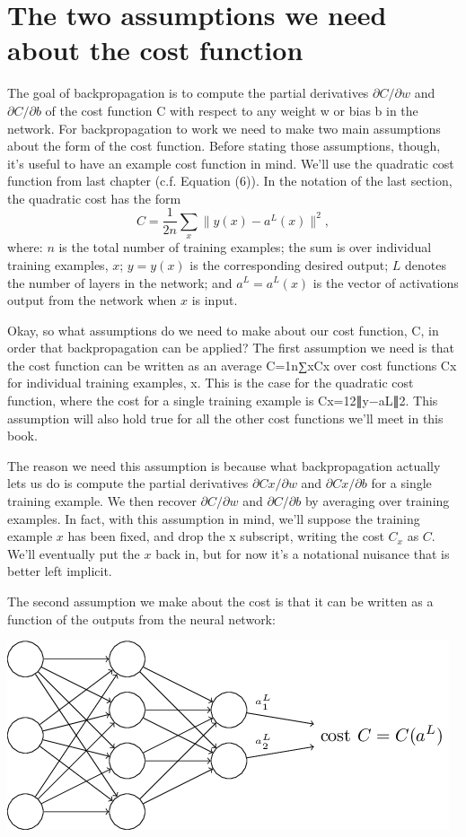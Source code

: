 \documentclass[a4paper,twoside,10pt]{book}
\begin{document}
\section{The two assumptions we need about the cost function}
The goal of backpropagation is to compute the partial derivatives $\partial{}C/\partial{}w$ and $\partial{}C/\partial{}b$ of the cost function C with respect to any weight w or bias b in the network. For backpropagation to work we need to make two main assumptions about the form of the cost function. Before stating those assumptions, though, it's useful to have an example cost function in mind. We'll use the quadratic cost function from last chapter (c.f. Equation (6)). In the notation of the last section, the quadratic cost has the form
\begin{equation}
C = \frac{1}{2n} \sum_x \|y(x)-a^L(x)\|^2,
\label{eq:26}
\end{equation}
where: $n$ is the total number of training examples; the sum is over individual training examples, $x$; $y=y(x)$ is the corresponding desired output; $L$ denotes the number of layers in the network; and $a^L=a^L(x)$ is the vector of activations output from the network when $x$ is input.

Okay, so what assumptions do we need to make about our cost function, C, in order that backpropagation can be applied? The first assumption we need is that the cost function can be written as an average C=1n∑xCx over cost functions Cx for individual training examples, x. This is the case for the quadratic cost function, where the cost for a single training example is Cx=12∥y−aL∥2. This assumption will also hold true for all the other cost functions we'll meet in this book.

The reason we need this assumption is because what backpropagation actually lets us do is compute the partial derivatives $\partial{}Cx/\partial{}w$ and $\partial{}Cx/\partial{}b$ for a single training example. We then recover $\partial{}C/\partial{}w$ and $\partial{}C/\partial{}b$ by averaging over training examples. In fact, with this assumption in mind, we'll suppose the training example $x$ has been fixed, and drop the x subscript, writing the cost $C_x$ as $C$. We'll eventually put the $x$ back in, but for now it's a notational nuisance that is better left implicit.

The second assumption we make about the cost is that it can be written as a function of the outputs from the neural network:

\includegraphics[width=0.7\linewidth]{./figures/ch2/tikz18}
\end{document}
